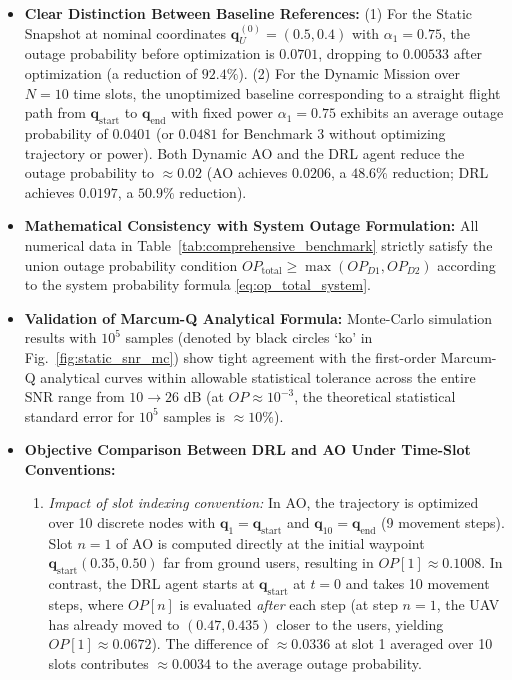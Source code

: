 \begin{itemize}
    \item \textbf{Clear Distinction Between Baseline References:} (1) For the Static Snapshot at nominal coordinates $\mathbf{q}_U^{(0)} = (0.5, 0.4)$ with $\alpha_1 = 0.75$, the outage probability before optimization is $0.0701$, dropping to $0.00533$ after optimization (a reduction of $92.4\%$). (2) For the Dynamic Mission over $N = 10$ time slots, the unoptimized baseline corresponding to a straight flight path from $\mathbf{q}_{\text{start}}$ to $\mathbf{q}_{\text{end}}$ with fixed power $\alpha_1 = 0.75$ exhibits an average outage probability of $0.0401$ (or $0.0481$ for Benchmark 3 without optimizing trajectory or power). Both Dynamic AO and the DRL agent reduce the outage probability to $\approx 0.02$ (AO achieves $0.0206$, a $48.6\%$ reduction; DRL achieves $0.0197$, a $50.9\%$ reduction).
    \item \textbf{Mathematical Consistency with System Outage Formulation:} All numerical data in Table~\ref{tab:comprehensive_benchmark} strictly satisfy the union outage probability condition $OP_{\text{total}} \ge \max(OP_{D1}, OP_{D2})$ according to the system probability formula \eqref{eq:op_total_system}.
    \item \textbf{Validation of Marcum-Q Analytical Formula:} Monte-Carlo simulation results with $10^5$ samples (denoted by black circles `ko' in Fig.~\ref{fig:static_snr_mc}) show tight agreement with the first-order Marcum-Q analytical curves within allowable statistical tolerance across the entire SNR range from $10 \to 26$ dB (at $OP \approx 10^{-3}$, the theoretical statistical standard error for $10^5$ samples is $\approx 10\%$).
    \item \textbf{Objective Comparison Between DRL and AO Under Time-Slot Conventions:}
    \begin{enumerate}
        \item \textit{Impact of slot indexing convention:} In AO, the trajectory is optimized over 10 discrete nodes with $\mathbf{q}_1 = \mathbf{q}_{\text{start}}$ and $\mathbf{q}_{10} = \mathbf{q}_{\text{end}}$ (9 movement steps). Slot $n = 1$ of AO is computed directly at the initial waypoint $\mathbf{q}_{\text{start}}(0.35, 0.50)$ far from ground users, resulting in $OP[1] \approx 0.1008$. In contrast, the DRL agent starts at $\mathbf{q}_{\text{start}}$ at $t = 0$ and takes 10 movement steps, where $OP[n]$ is evaluated \textit{after} each step (at step $n = 1$, the UAV has already moved to $(0.47, 0.435)$ closer to the users, yielding $OP[1] \approx 0.0672$). The difference of $\approx 0.0336$ at slot 1 averaged over 10 slots contributes $\approx 0.0034$ to the average outage probability.

\end{enumerate}
\end{itemize}
